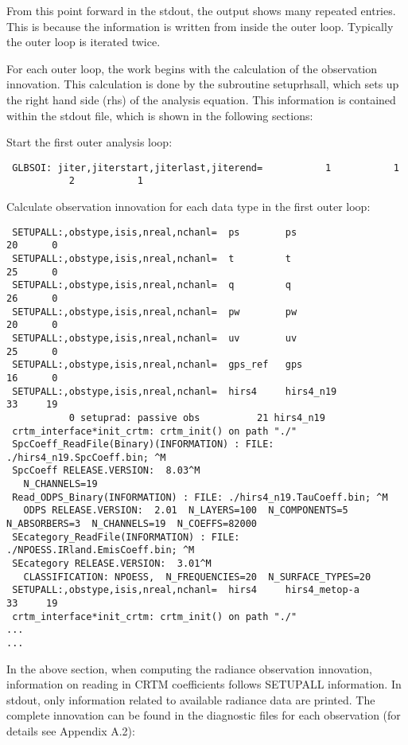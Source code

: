 From this point forward in the stdout, the output shows many repeated entries. This is because the information is written from inside the outer loop. Typically the outer loop is iterated twice.

For each outer loop, the work begins with the calculation of the observation innovation. This calculation is done by the subroutine setuprhsall, which sets up the right hand side (rhs) of the analysis equation. This information is contained within the stdout file, which is shown in the following sections: 

Start the first outer analysis loop:

\begin{scriptsize}
\begin{verbatim}
 GLBSOI: jiter,jiterstart,jiterlast,jiterend=           1           1
           2           1
\end{verbatim}
\end{scriptsize}
Calculate observation innovation for each data type in the first outer loop:

\begin{scriptsize}
\begin{verbatim} 
 SETUPALL:,obstype,isis,nreal,nchanl=  ps        ps                       20      0
 SETUPALL:,obstype,isis,nreal,nchanl=  t         t                        25      0
 SETUPALL:,obstype,isis,nreal,nchanl=  q         q                        26      0
 SETUPALL:,obstype,isis,nreal,nchanl=  pw        pw                       20      0
 SETUPALL:,obstype,isis,nreal,nchanl=  uv        uv                       25      0
 SETUPALL:,obstype,isis,nreal,nchanl=  gps_ref   gps                      16      0
 SETUPALL:,obstype,isis,nreal,nchanl=  hirs4     hirs4_n19                33     19
           0 setuprad: passive obs          21 hirs4_n19
 crtm_interface*init_crtm: crtm_init() on path "./"
 SpcCoeff_ReadFile(Binary)(INFORMATION) : FILE: ./hirs4_n19.SpcCoeff.bin; ^M
 SpcCoeff RELEASE.VERSION:  8.03^M
   N_CHANNELS=19
 Read_ODPS_Binary(INFORMATION) : FILE: ./hirs4_n19.TauCoeff.bin; ^M
   ODPS RELEASE.VERSION:  2.01  N_LAYERS=100  N_COMPONENTS=5  N_ABSORBERS=3  N_CHANNELS=19  N_COEFFS=82000
 SEcategory_ReadFile(INFORMATION) : FILE: ./NPOESS.IRland.EmisCoeff.bin; ^M
 SEcategory RELEASE.VERSION:  3.01^M
   CLASSIFICATION: NPOESS,  N_FREQUENCIES=20  N_SURFACE_TYPES=20
 SETUPALL:,obstype,isis,nreal,nchanl=  hirs4     hirs4_metop-a            33     19
 crtm_interface*init_crtm: crtm_init() on path "./"
...
...
\end{verbatim}
\end{scriptsize}
In the above section, when computing the radiance observation innovation, information on reading in CRTM coefficients follows SETUPALL information. In stdout, only information related to available radiance data are printed. The complete innovation can be found in the diagnostic files for each observation (for details see Appendix A.2): 

